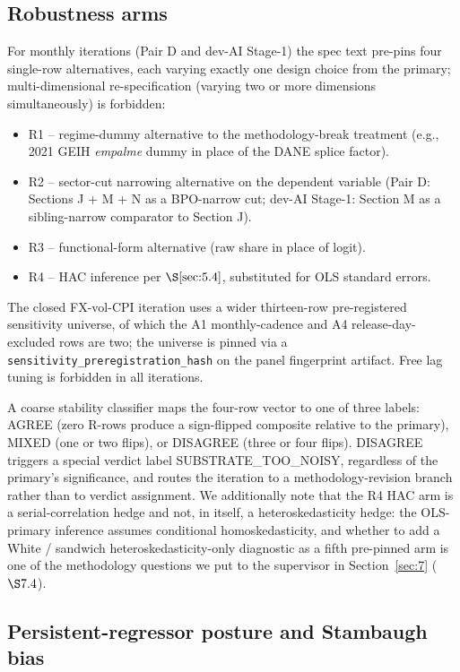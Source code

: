 \subsection{Robustness arms}\label{sec:5.5}

For monthly iterations (Pair D and dev-AI Stage-1) the spec text
pre-pins four single-row alternatives, each varying exactly one design
choice from the primary; multi-dimensional re-specification (varying
two or more dimensions simultaneously) is forbidden:
\begin{itemize}
  \item R1 -- regime-dummy alternative to the methodology-break
    treatment (e.g., 2021 GEIH \emph{empalme} dummy in place of the DANE
    splice factor).
  \item R2 -- sector-cut narrowing alternative on the dependent variable
    (Pair D: Sections J + M + N as a BPO-narrow cut; dev-AI Stage-1:
    Section M as a sibling-narrow comparator to Section J).
  \item R3 -- functional-form alternative (raw share in place of logit).
  \item R4 -- HAC inference per \(\S\ref{sec:5.4}\), substituted for
    OLS standard errors.
\end{itemize}
The closed FX-vol-CPI iteration uses a wider thirteen-row pre-registered
sensitivity universe, of which the A1 monthly-cadence and A4
release-day-excluded rows are two; the universe is pinned via a
\texttt{sensitivity\_preregistration\_hash} on the panel fingerprint
artifact. Free lag tuning is forbidden in all iterations.

A coarse stability classifier maps the four-row vector to one of three
labels: AGREE (zero R-rows produce a sign-flipped composite relative to
the primary), MIXED (one or two flips), or DISAGREE (three or four
flips). DISAGREE triggers a special verdict label
SUBSTRATE\_TOO\_NOISY, regardless of the primary's significance, and
routes the iteration to a methodology-revision branch rather than to
verdict assignment. We additionally note that the R4 HAC arm is a
serial-correlation hedge and not, in itself, a heteroskedasticity hedge:
the OLS-primary inference assumes conditional homoskedasticity, and
whether to add a White / sandwich heteroskedasticity-only diagnostic as
a fifth pre-pinned arm is one of the methodology questions we put to the
supervisor in Section~\ref{sec:7} (\(\S 7.4\)).

\subsection{Persistent-regressor posture and Stambaugh
bias}\label{sec:5.5b}

